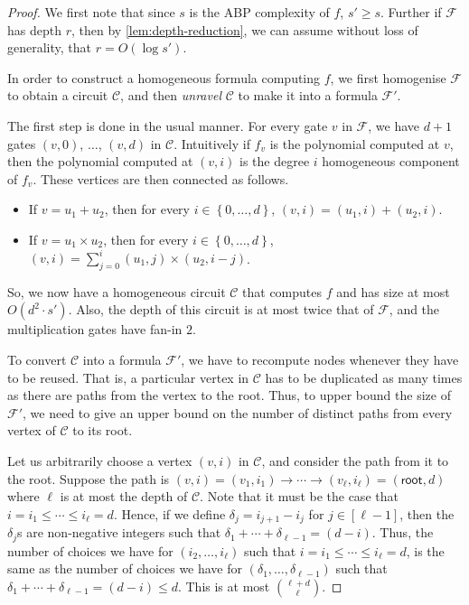 \documentclass[10pt,a4paper]{article}
\def\set#1{\left\{ #1 \right\}}
\newcommand{\ckt}{\textbf{$\mathcal{C}$}}
\newcommand{\form}{\textbf{$\mathcal{F}$}}
\newcommand{\rt}{\mathsf{root}}
\begin{document}
\homogenisation*

\begin{proof}
	We first note that since $s$ is the ABP complexity of $f$, $s' \geq s$.
	Further if $\form$ has depth $r$, then by \autoref{lem:depth-reduction}, we can assume without loss of generality, that $r = O(\log s')$.
	
	In order to construct a homogeneous formula computing $f$, we first homogenise $\form$ to obtain a circuit $\ckt$, and then \emph{unravel} $\ckt$ to make it into a formula $\form'$.	
	
	The first step is done in the usual manner.
	For every gate $v$ in $\form$, we have $d+1$ gates $(v,0)$, $\ldots$, $(v,d)$ in $\ckt$.
	Intuitively if $f_v$ is the polynomial computed at $v$, then the polynomial computed at $(v,i)$ is the degree $i$ homogeneous component of $f_v$. 
	These vertices are then connected as follows.
	
	\begin{itemize}
		\item If $v = u_1 + u_2$, then for every $i \in \set{0, \ldots, d}$, \qquad $(v, i) = (u_1, i) + (u_2, i)$.
		\item If $v = u_1 \times u_2$, then for every $i \in \set{0, \ldots, d}$, \qquad $(v, i) = \sum_{j=0}^{i} (u_1, j) \times (u_2, i-j)$.
	\end{itemize}

	So, we now have a homogeneous circuit $\ckt$ that computes $f$ and has size at most $O(d^2 \cdot s')$.
	Also, the depth of this circuit is at most twice that of $\form$, and the multiplication gates have fan-in $2$.
%
	
	To convert $\ckt$ into a formula $\form'$, we have to recompute nodes whenever they have to be reused. 
	That is, a particular vertex in $\ckt$ has to be duplicated as many times as there are paths from the vertex to the root. 
	Thus, to upper bound the size of $\form'$, we need to give an upper bound on the number of distinct paths from every vertex of $\ckt$ to its root.
	
	Let us arbitrarily choose a vertex $(v,i)$ in $\ckt$, and consider the path from it to the root. 
	Suppose the path is $(v,i) = (v_1, i_1) \rightarrow \cdots \rightarrow (v_\ell, i_\ell) = (\rt, d)$ where $\ell$ is at most the depth of $\ckt$. 
	Note that it must be the case that $i = i_1 \leq \cdots \leq i_\ell = d$. 
	Hence, if we define $\delta_j = i_{j+1} - i_j$ for $j \in [\ell-1]$, then the $\delta_j$s are non-negative integers such that $\delta_1 + \cdots + \delta_{\ell-1} = (d - i)$. 
	Thus, the number of  choices we have for $(i_2, \ldots, i_\ell)$ such that $i = i_1 \leq \cdots \leq i_\ell = d$, is the same as the number of choices we have for $(\delta_1, \ldots, \delta_{\ell-1})$ such that $\delta_1 + \cdots + \delta_{\ell -  1} = (d - i) \leq d$. 
	This is at most ${\ell + d}\choose{\ell}$.
	

\end{proof}
\end{document}
